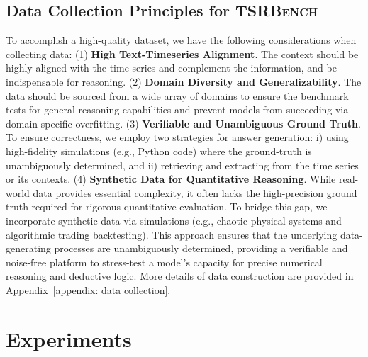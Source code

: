 \documentclass{article}
\theoremstyle{plain}
\theoremstyle{definition}
\theoremstyle{remark}
\newcommand\ours{\textsc{TSRBench}\xspace}
\theoremstyle{plain}
\begin{document}
\subsection{Data Collection Principles for \ours}
To accomplish a high-quality dataset, we have the following considerations when collecting data: 
(1) \textbf{High Text-Timeseries Alignment}. The context should be highly aligned with the time series and complement the information, and be indispensable for reasoning. 
(2) \textbf{Domain Diversity and Generalizability}. The data should be sourced from a wide array of domains to ensure the benchmark tests for general reasoning capabilities and prevent models from succeeding via domain-specific overfitting.
(3) \textbf{Verifiable and Unambiguous Ground Truth}. To ensure correctness, we employ two strategies for answer generation: i) using high-fidelity simulations (e.g., Python code) where the ground-truth is unambiguously determined, and ii) retrieving and extracting from the time series or its contexts. 
(4) \textbf{Synthetic Data for Quantitative Reasoning}. While real-world data provides essential complexity, it often lacks the high-precision ground truth required for rigorous quantitative evaluation. To bridge this gap, we incorporate synthetic data via simulations (e.g., chaotic physical systems and algorithmic trading backtesting). This approach ensures that the underlying data-generating processes are unambiguously determined, providing a verifiable and noise-free platform to stress-test a model's capacity for precise numerical reasoning and deductive logic.
More details of data construction are provided in Appendix~\ref{appendix: data collection}.

\section{Experiments}
\end{document}
